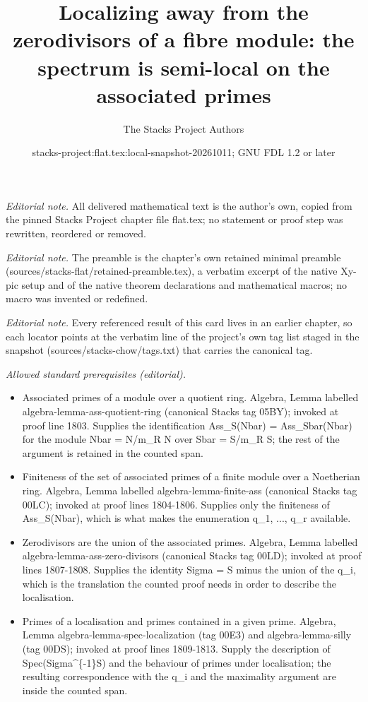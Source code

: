 \documentclass[10pt,a4paper]{amsart}
\title{Localizing away from the zerodivisors of a fibre module: the spectrum is semi-local on the associated primes}
\author{The Stacks Project Authors}
\date{stacks-project:flat.tex:local-snapshot-20261011; GNU FDL 1.2 or later}
\theoremstyle{plain}
\theoremstyle{definition}
\theoremstyle{remark}
\numberwithin{equation}{subsection}
\begin{document}
\maketitle
\noindent\textit{Editorial note.} All delivered mathematical text is the author's own, copied from the pinned Stacks Project chapter file flat.tex; no statement or proof step was rewritten, reordered or removed.\par\medskip
\noindent\textit{Editorial note.} The preamble is the chapter's own retained minimal preamble (sources/stacks-flat/retained-preamble.tex), a verbatim excerpt of the native Xy-pic setup and of the native theorem declarations and mathematical macros; no macro was invented or redefined.\par\medskip
\noindent\textit{Editorial note.} Every referenced result of this card lives in an earlier chapter, so each locator points at the verbatim line of the project's own tag list staged in the snapshot (sources/stacks-chow/tags.txt) that carries the canonical tag.\par\medskip
\noindent\textit{Allowed standard prerequisites (editorial).}\begin{itemize}
\item Associated primes of a module over a quotient ring. Algebra, Lemma labelled algebra-lemma-ass-quotient-ring (canonical Stacks tag 05BY); invoked at proof line 1803. Supplies the identification Ass\_S(Nbar) = Ass\_Sbar(Nbar) for the module Nbar = N/m\_R N over Sbar = S/m\_R S; the rest of the argument is retained in the counted span.
\item Finiteness of the set of associated primes of a finite module over a Noetherian ring. Algebra, Lemma labelled algebra-lemma-finite-ass (canonical Stacks tag 00LC); invoked at proof lines 1804-1806. Supplies only the finiteness of Ass\_S(Nbar), which is what makes the enumeration q\_1, ..., q\_r available.
\item Zerodivisors are the union of the associated primes. Algebra, Lemma labelled algebra-lemma-ass-zero-divisors (canonical Stacks tag 00LD); invoked at proof lines 1807-1808. Supplies the identity Sigma = S minus the union of the q\_i, which is the translation the counted proof needs in order to describe the localisation.
\item Primes of a localisation and primes contained in a given prime. Algebra, Lemma algebra-lemma-spec-localization (tag 00E3) and algebra-lemma-silly (tag 00DS); invoked at proof lines 1809-1813. Supply the description of Spec(Sigma\textasciicircum{}\{-1\}S) and the behaviour of primes under localisation; the resulting correspondence with the q\_i and the maximality argument are inside the counted span.
\end{itemize}\medskip
\end{document}
